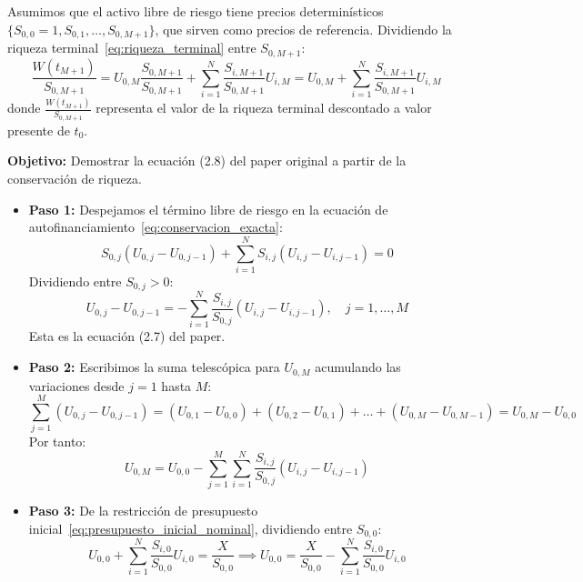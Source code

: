 \documentclass[11pt,a4paper]{report}
\numberwithin{equation}{chapter}
\begin{document}
Asumimos que el activo libre de riesgo tiene precios determinísticos $\{S_{0,0}=1, S_{0,1}, \dots, S_{0,M+1}\}$, que sirven como precios de referencia. Dividiendo la riqueza terminal~\eqref{eq:riqueza_terminal} entre $S_{0,M+1}$:
\begin{equation}
    \frac{W(t_{M+1})}{S_{0,M+1}} = U_{0,M} \frac{S_{0,M+1}}{S_{0,M+1}} + \sum_{i=1}^N \frac{S_{i,M+1}}{S_{0,M+1}} U_{i,M} = U_{0,M} + \sum_{i=1}^N \frac{S_{i,M+1}}{S_{0,M+1}} U_{i,M} \label{eq:terminal_descontada}
\end{equation}
donde $\frac{W(t_{M+1})}{S_{0,M+1}}$ representa el valor de la riqueza terminal descontado a valor presente de $t_0$.

\begin{demobox}
\textbf{Objetivo:} Demostrar la ecuación (2.8) del paper original a partir de la conservación de riqueza.

\begin{itemize}[leftmargin=1.5em]
    \item \textbf{Paso 1:} Despejamos el término libre de riesgo en la ecuación de autofinanciamiento~\eqref{eq:conservacion_exacta}:
    \begin{equation}
        S_{0,j}(U_{0,j} - U_{0,j-1}) + \sum_{i=1}^N S_{i,j}(U_{i,j} - U_{i,j-1}) = 0
    \end{equation}
    Dividiendo entre $S_{0,j} > 0$:
    \begin{equation}
        U_{0,j} - U_{0,j-1} = - \sum_{i=1}^N \frac{S_{i,j}}{S_{0,j}} (U_{i,j} - U_{i,j-1}), \quad j = 1, \dots, M
    \end{equation}
    Esta es la ecuación (2.7) del paper.
    
    \item \textbf{Paso 2:} Escribimos la suma telescópica para $U_{0,M}$ acumulando las variaciones desde $j=1$ hasta $M$:
    \begin{equation}
        \sum_{j=1}^M (U_{0,j} - U_{0,j-1}) = (U_{0,1} - U_{0,0}) + (U_{0,2} - U_{0,1}) + \dots + (U_{0,M} - U_{0,M-1}) = U_{0,M} - U_{0,0}
    \end{equation}
    Por tanto:
    \begin{equation}
        U_{0,M} = U_{0,0} - \sum_{j=1}^M \sum_{i=1}^N \frac{S_{i,j}}{S_{0,j}} (U_{i,j} - U_{i,j-1})
    \end{equation}
    
    \item \textbf{Paso 3:} De la restricción de presupuesto inicial~\eqref{eq:presupuesto_inicial_nominal}, dividiendo entre $S_{0,0}$:
    \begin{equation}
        U_{0,0} + \sum_{i=1}^N \frac{S_{i,0}}{S_{0,0}} U_{i,0} = \frac{X}{S_{0,0}} \implies U_{0,0} = \frac{X}{S_{0,0}} - \sum_{i=1}^N \frac{S_{i,0}}{S_{0,0}} U_{i,0}
    \end{equation}
    

\end{itemize}
\end{demobox}
\end{document}
